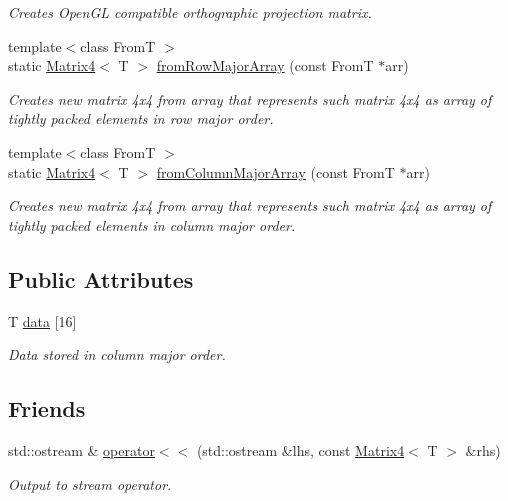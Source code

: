 \begin{DoxyCompactItemize}
\begin{DoxyCompactList}\small\item\em Creates OpenGL compatible orthographic projection matrix. \item\end{DoxyCompactList}\item 
{\footnotesize template$<$class FromT $>$ }\\static \hyperlink{class_matrix4}{Matrix4}$<$ T $>$ \hyperlink{class_matrix4_af5d6a66cc20b3558b448104099d9693e}{fromRowMajorArray} (const FromT $\ast$arr)
\begin{DoxyCompactList}\small\item\em Creates new matrix 4x4 from array that represents such matrix 4x4 as array of tightly packed elements in row major order. \item\end{DoxyCompactList}\item 
{\footnotesize template$<$class FromT $>$ }\\static \hyperlink{class_matrix4}{Matrix4}$<$ T $>$ \hyperlink{class_matrix4_a1c9e68efd1cd024385403a57fcacf513}{fromColumnMajorArray} (const FromT $\ast$arr)
\begin{DoxyCompactList}\small\item\em Creates new matrix 4x4 from array that represents such matrix 4x4 as array of tightly packed elements in column major order. \item\end{DoxyCompactList}\end{DoxyCompactItemize}
\subsection*{Public Attributes}
\begin{DoxyCompactItemize}
\item 
T \hyperlink{class_matrix4_a8941190ba31803101cdfd94ff89f2a66}{data} \mbox{[}16\mbox{]}
\begin{DoxyCompactList}\small\item\em Data stored in column major order. \item\end{DoxyCompactList}\end{DoxyCompactItemize}
\subsection*{Friends}
\begin{DoxyCompactItemize}
\item 
std::ostream \& \hyperlink{class_matrix4_a0c80b0aa66b23ac6ad3bdcf81a0ada10}{operator$<$$<$} (std::ostream \&lhs, const \hyperlink{class_matrix4}{Matrix4}$<$ T $>$ \&rhs)
\begin{DoxyCompactList}\small\item\em Output to stream operator. \item\end{DoxyCompactList}\end{DoxyCompactItemize}


